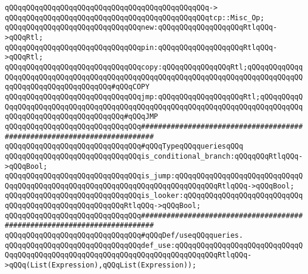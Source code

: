 \verb|qQQqqQQqqQQqqQQqqQQqqQQqqQQqqQQqqQQqqQQqqQQqqQQq->|\newline
\verb|qQQqqQQqqQQqqQQqqQQqqQQqqQQqqQQqqQQqqQQqqQQqqQQqtcp::Misc_Op;|\newline
\newline
\verb|qQQqqQQqqQQqqQQqqQQqqQQqqQQqqQQqnew:qQQqqQQqqQQqqQQqqQQqRtlqQQq->qQQqRtl;|\newline
\verb|qQQqqQQqqQQqqQQqqQQqqQQqqQQqqQQqpin:qQQqqQQqqQQqqQQqqQQqRtlqQQq->qQQqRtl;|\newline
\verb|qQQqqQQqqQQqqQQqqQQqqQQqqQQqqQQqcopy:qQQqqQQqqQQqqQQqRtl;qQQqqQQqqQQqqQQqqQQqqQQqqQQqqQQqqQQqqQQqqQQqqQQqqQQqqQQqqQQqqQQqqQQqqQQqqQQqqQQqqQQqqQQqqQQqqQQqqQQqqQQqqQQq#qQQqCOPY|\newline
\verb|qQQqqQQqqQQqqQQqqQQqqQQqqQQqqQQqjmp:qQQqqQQqqQQqqQQqqQQqRtl;qQQqqQQqqQQqqQQqqQQqqQQqqQQqqQQqqQQqqQQqqQQqqQQqqQQqqQQqqQQqqQQqqQQqqQQqqQQqqQQqqQQqqQQqqQQqqQQqqQQqqQQqqQQq#qQQqJMP|\newline
\newline
\newline
\newline
\verb|qQQqqQQqqQQqqQQqqQQqqQQqqQQqqQQq#########################################################################|\newline
\verb|qQQqqQQqqQQqqQQqqQQqqQQqqQQqqQQq#qQQqTypeqQQqqueriesqQQq|\newline
\newline
\verb|qQQqqQQqqQQqqQQqqQQqqQQqqQQqqQQqis_conditional_branch:qQQqqQQqRtlqQQq->qQQqBool;|\newline
\verb|qQQqqQQqqQQqqQQqqQQqqQQqqQQqqQQqis_jump:qQQqqQQqqQQqqQQqqQQqqQQqqQQqqQQqqQQqqQQqqQQqqQQqqQQqqQQqqQQqqQQqqQQqqQQqqQQqqQQqRtlqQQq->qQQqBool;|\newline
\verb|qQQqqQQqqQQqqQQqqQQqqQQqqQQqqQQqis_looker:qQQqqQQqqQQqqQQqqQQqqQQqqQQqqQQqqQQqqQQqqQQqqQQqqQQqqQQqRtlqQQq->qQQqBool;|\newline
\newline
\newline
\newline
\verb|qQQqqQQqqQQqqQQqqQQqqQQqqQQqqQQq#########################################################################|\newline
\verb|qQQqqQQqqQQqqQQqqQQqqQQqqQQqqQQq#qQQqDef/useqQQqqueries.|\newline
\newline
\verb|qQQqqQQqqQQqqQQqqQQqqQQqqQQqqQQqdef_use:qQQqqQQqqQQqqQQqqQQqqQQqqQQqqQQqqQQqqQQqqQQqqQQqqQQqqQQqqQQqqQQqqQQqqQQqqQQqqQQqRtlqQQq->qQQq(List(Expression),qQQqList(Expression));|\newline

